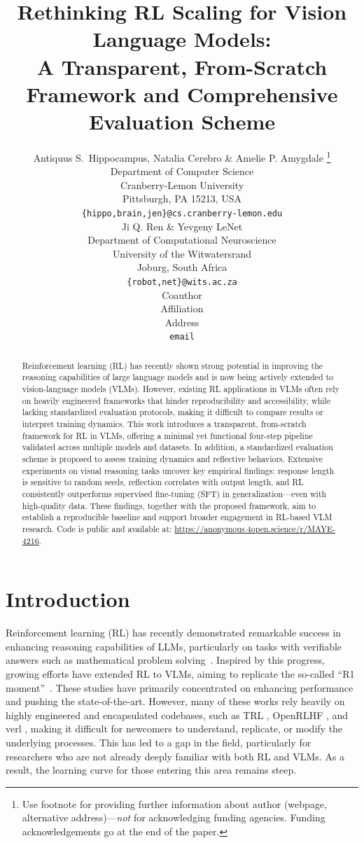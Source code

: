 \documentclass{article} %
\title{Rethinking RL Scaling for Vision Language Models: \\A Transparent, From-Scratch Framework and Comprehensive Evaluation Scheme}
\author{Antiquus S.~Hippocampus, Natalia Cerebro \& Amelie P. Amygdale \thanks{ Use footnote for providing further information
about author (webpage, alternative address)---\emph{not} for acknowledging
funding agencies.  Funding acknowledgements go at the end of the paper.} \\
Department of Computer Science\\
Cranberry-Lemon University\\
Pittsburgh, PA 15213, USA \\
\texttt{\{hippo,brain,jen\}@cs.cranberry-lemon.edu} \\
\And
Ji Q. Ren \& Yevgeny LeNet \\
Department of Computational Neuroscience \\
University of the Witwatersrand \\
Joburg, South Africa \\
\texttt{\{robot,net\}@wits.ac.za} \\
\AND
Coauthor \\
Affiliation \\
Address \\
\texttt{email}
}
\begin{document}
\ifcolmsubmission
\linenumbers
\fi

\maketitle
\begin{abstract}
Reinforcement learning (RL) has recently shown strong potential in improving the reasoning capabilities of large language models and is now being actively extended to vision-language models (VLMs). However, existing RL applications in VLMs often rely on heavily engineered frameworks that hinder reproducibility and accessibility, while lacking standardized evaluation protocols, making it difficult to compare results or interpret training dynamics. This work introduces a transparent, from-scratch framework for RL in VLMs, offering a minimal yet functional four-step pipeline validated across multiple models and datasets. In addition, a standardized evaluation scheme is proposed to assess training dynamics and reflective behaviors. Extensive experiments on visual reasoning tasks uncover key empirical findings: response length is sensitive to random seeds, reflection correlates with output length, and RL consistently outperforms supervised fine-tuning (SFT) in generalization—even with high-quality data. These findings, together with the proposed framework, aim to establish a reproducible baseline and support broader engagement in RL-based VLM research. Code is public and available at: \url{https://anonymous.4open.science/r/MAYE-4216}.
\end{abstract}


\section{Introduction}
Reinforcement learning (RL) has recently demonstrated remarkable success in enhancing reasoning capabilities of LLMs, particularly on tasks with verifiable answers such as mathematical problem solving~\citep{guo2025deepseekR1,rl_survey}. Inspired by this progress, growing efforts have extended RL to VLMs, aiming to replicate the so-called “R1 moment”~\citep{wang2025multimodal,qwen2025qvqmax}. 
%
These studies have primarily concentrated on enhancing performance and pushing the state-of-the-art. However, many of these works rely heavily on highly engineered and encapsulated codebases, such as TRL \citep{vonwerra2022trl}, OpenRLHF \citep{hu2024openrlhf}, and verl \citep{sheng2024hybridflow}, making it difficult for newcomers to understand, replicate, or modify the underlying processes. This has led to a gap in the field, particularly for researchers who are not already deeply familiar with both RL and VLMs. As a result, the learning curve for those entering this area remains steep.
\end{document}
